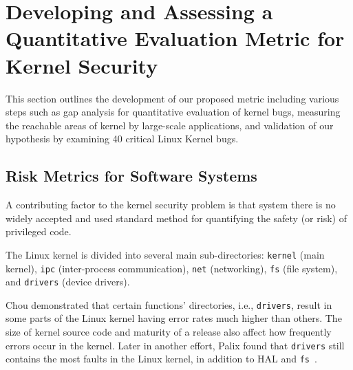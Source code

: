 \section{Developing and Assessing a Quantitative Evaluation Metric for Kernel Security}
\label{sec.metric}



This section outlines the development of our proposed metric including various steps such as gap analysis for 
quantitative evaluation of kernel bugs, measuring the reachable areas of kernel by large-scale applications, 
and validation of our hypothesis by examining 40 critical Linux Kernel bugs.

\subsection{Risk Metrics for Software Systems}

A contributing factor to the kernel security problem is that system there is no widely accepted and 
used standard method for quantifying the safety (or risk) of privileged code.  


The Linux kernel is divided into several main sub-directories:
\texttt{kernel} (main kernel), \texttt{ipc} (inter-process communication),
\texttt{net} (networking), \texttt{fs} (file system), and \texttt{drivers} (device drivers).

Chou \cite{PittSFIeld} demonstrated that certain functions' directories, i.e., \texttt{drivers}, 
result in some parts of the Linux kernel having error rates much higher than others. 
The size of kernel source code and maturity of a release also affect how frequently errors occur in the kernel. 
Later in another effort, Palix found that \texttt{drivers} still contains the most faults in
the Linux kernel, in addition to HAL and \texttt{fs}~\cite{palix2011faults}.


